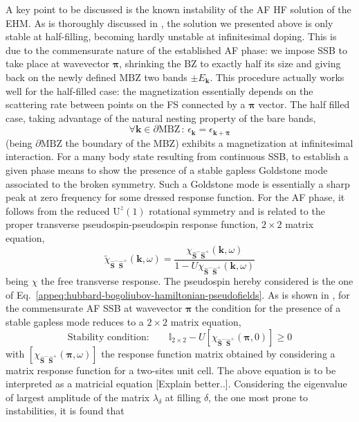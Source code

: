 A key point to be discussed is the known instability of the AF HF solution of the EHM. As is thoroughly discussed in \cite{singh1990collective}, the solution we presented above is only stable at half-filling, becoming hardly unstable at infinitesimal doping. This is due to the commensurate nature of the established AF phase: we impose SSB to take place at wavevector $\bm{\pi}$, shrinking the BZ to exactly half its size and giving back on the newly defined MBZ two bands $\pm E_\mathbf{k}$. This procedure actually works well for the half-filled case: the magnetization essentially depends on the scattering rate between points on the FS connected by a $\bm{\pi}$ vector. The half filled case, taking advantage of the natural nesting property of the bare bands,
\[
 	\forall \mathbf{k}\in\partial\mathrm{MBZ}\,\colon\, \epsilon_{\mathbf{k}} = \epsilon_{\mathbf{k}+\bm{\pi}}
\]
(being $\partial\mathrm{MBZ}$ the boundary of the MBZ) exhibits a magnetization at infinitesimal interaction. For a many body state resulting from continuous SSB, to establish a given phase means to show the presence of a stable gapless Goldstone mode associated to the broken symmetry. Such a Goldstone mode is essentially a sharp peak at zero frequency for some dressed response function. For the AF phase, it follows from the reduced $\mathrm{U}^z(1)$ rotational symmetry and is related to the proper transverse pseudospin-pseudospin response function,
$2\times 2$ matrix equation,
\begin{equation}\label{appeq:af-commensurate-proper-response}
	\tilde{\chi}_{\hat{\mathbf{S}}^- \hat{\mathbf{S}}^+}(\mathbf{k},\omega) = \frac{\chi_{\hat{\mathbf{S}}^- \hat{\mathbf{S}}^+}(\mathbf{k},\omega)}{1 - U \chi_{\hat{\mathbf{S}}^- \hat{\mathbf{S}}^+}(\mathbf{k},\omega)}
\end{equation}
being $\chi$ the free transverse response. The pseudospin hereby considered is the one of Eq.~\eqref{appeq:hubbard-bogoliubov-hamiltonian-pseudofields}. As is shown in \cite{singh1990collective}, for the commensurate AF SSB at wavevector $\bm{\pi}$ the condition for the presence of a stable gapless mode reduces to a $2\times 2$ matrix equation,
\begin{equation}\label{appeq:af-commensurate-stability-condition}
	\text{Stability condition:}
	\qquad
	\mathbb{I}_{2\times2} - U \left[\chi_{\hat{\mathbf{S}}^- \hat{\mathbf{S}}^+}(\bm{\pi},0)\right] \ge 0
\end{equation}
with $\left[\chi_{\hat{\mathbf{S}}^- \hat{\mathbf{S}}^+}(\bm{\pi},\omega)\right]$ the response function matrix obtained by considering a matrix response function for a two-sites unit cell. The above equation is to be interpreted as a matricial equation {\color{tabred}[Explain better..]}. Considering the eigenvalue of largest amplitude of the matrix $\lambda_\delta$ at filling $\delta$, the one most prone to instabilities, it is found that
